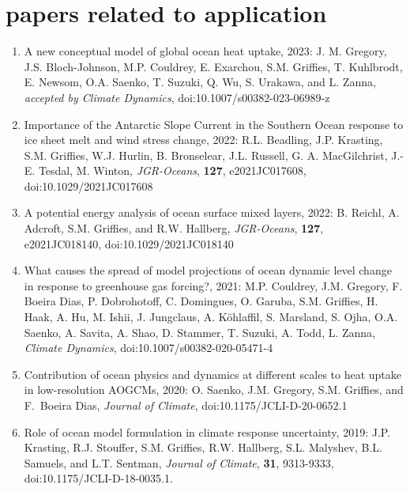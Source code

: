 \vspace{-.75cm}

\section*{\sc \color{Maroon} papers related to application}

\small 

\vspace{-.25cm}
\begin{enumerate}[leftmargin=*]


\item A new conceptual model of global ocean heat uptake, 2023:  J. M. Gregory, J.S. Bloch-Johnson, M.P. Couldrey, E. Exarchou, S.M. Grif\/f\/ies, T. Kuhlbrodt, E. Newsom, O.A. Saenko, T. Suzuki, Q. Wu, S. Urakawa, and L. Zanna, {\it accepted by Climate Dynamics}, doi:10.1007/s00382-023-06989-z
 
\item Importance of the Antarctic Slope Current in the Southern Ocean response to ice sheet melt and wind stress change, 2022: R.L. Beadling, J.P. Krasting, S.M. Grif\/f\/ies, W.J. Hurlin, B. Bronselear, J.L. Russell, G. A. MacGilchrist, J.-E. Tesdal, M. Winton, {\it JGR-Oceans}, {\bf 127}, e2021JC017608, doi:10.1029/2021JC017608

\item A potential energy analysis of ocean surface mixed layers, 2022: B. Reichl, A. Adcroft, S.M. Grif\/f\/ies, and R.W. Hallberg, {\it JGR-Oceans}, {\bf 127}, e2021JC018140, doi:10.1029/2021JC018140

\item What causes the spread of model projections of ocean dynamic level change in response to greenhouse gas forcing?, 2021:  M.P. Couldrey, J.M. Gregory,  F. Boeira Dias, P. Dobrohotoff, C. Domingues, O. Garuba, S.M. Griffies, H. Haak, A. Hu, M. Ishii, J. Jungclaus, A. {K\"{o}hlaffil}, S. Marsland, S. Ojha, O.A. Saenko, A. Savita, A. Shao, D. Stammer, T. Suzuki, A. Todd, L. Zanna, {\it Climate Dynamics}, doi:10.1007/s00382-020-05471-4

\item Contribution of ocean physics and dynamics at different scales to heat uptake in low-resolution AOGCMs, 2020: O. Saenko, J.M. Gregory, S.M. Grif\/f\/ies, and F.\ Boeira Dias, {\it Journal of Climate}, doi:10.1175/JCLI-D-20-0652.1

\item Role of ocean model formulation in climate response uncertainty, 2019: J.P. Krasting, R.J. Stouffer, S.M. Grif\/f\/ies, R.W. Hallberg, S.L. Malyshev, B.L. Samuels, and L.T. Sentman, {\it Journal of Climate}, {\bf 31}, 9313-9333, doi:10.1175/JCLI-D-18-0035.1.


\end{enumerate}

